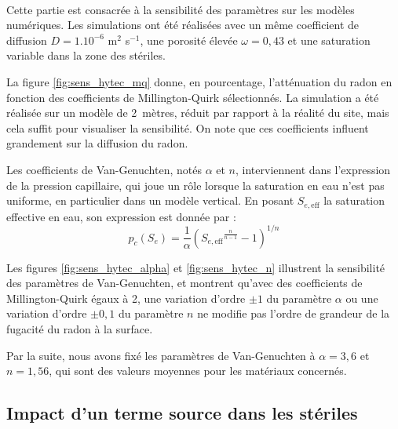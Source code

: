 \documentclass{article}
\begin{document}
\paragraph{} Cette partie est consacrée à la sensibilité des paramètres sur les modèles numériques. Les simulations ont été réalisées avec un même coefficient de diffusion $D = 1.10^{-6}$ m$^2 \!$ s$^{-1}$, une porosité élevée $\omega = 0,43$ et une saturation variable dans la zone des stériles.

La figure \ref{fig:sens_hytec_mq} donne, en pourcentage, l'atténuation du radon en fonction des coefficients de Millington-Quirk sélectionnés. La simulation a été réalisée sur un modèle de 2~mètres, réduit par rapport à la réalité du site, mais cela suffit pour visualiser la sensibilité. On note que ces coefficients influent grandement sur la diffusion du radon.

Les coefficients de Van-Genuchten, notés $\alpha$ et $n$, interviennent dans l’expression de la pression capillaire, qui joue un rôle lorsque la saturation en eau n’est pas uniforme, en particulier dans un modèle vertical. En posant $S_{e,\text{eff}}$ la saturation effective en eau, son expression est donnée par :
$$
p_c (S_e)= \dfrac{1}{\alpha} \left( {S_{e,\text{eff}} }^{\frac{n}{n-1}} -1 \right)^{1/n}
$$

Les figures \ref{fig:sens_hytec_alpha} et \ref{fig:sens_hytec_n} illustrent la sensibilité des paramètres de Van-Genuchten, et montrent qu'avec des coefficients de Millington-Quirk égaux à 2, une variation d’ordre $\pm 1$ du paramètre $\alpha$ ou une variation d’ordre $\pm 0,1$ du paramètre $n$ ne modifie pas l’ordre de grandeur de la fugacité du radon à la surface.

Par la suite, nous avons fixé les paramètres de Van-Genuchten à $\alpha = 3,6$ et $n=1,56$, qui sont des valeurs moyennes pour les matériaux concernés.

\subsection{Impact d'un terme source dans les stériles}
\label{annexe:termesource}
\end{document}

